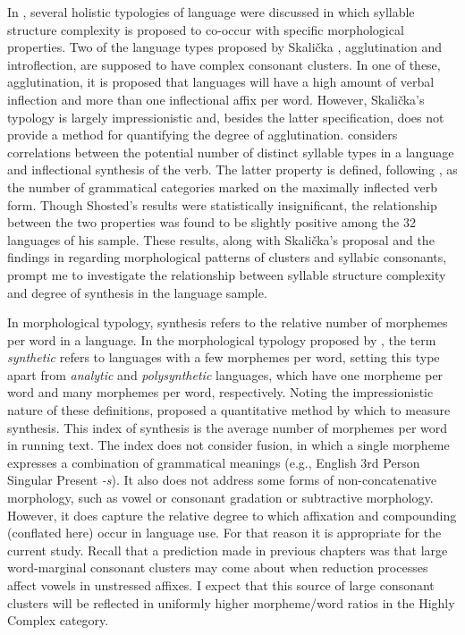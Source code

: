   In , several holistic typologies of language were discussed in which syllable structure complexity is proposed to co-occur with specific morphological properties. Two of the language types proposed by Skalička , agglutination and introflection, are supposed to have complex consonant clusters. In one of these, agglutination, it is proposed that languages will have a high amount of verbal inflection and more than one inflectional affix per word. However, Skalička’s typology is largely impressionistic and, besides the latter specification, does not provide a method for quantifying the degree of agglutination. \citet{Shosted2006} considers correlations between the potential number of distinct syllable types in a language and inflectional synthesis of the verb. The latter property is defined, following \citet{BickelNichols2005}, as the number of grammatical categories marked on the maximally inflected verb form. Though Shosted’s results were statistically insignificant, the relationship between the two properties was found to be slightly positive among the 32 languages of his sample. These results, along with Skalička’s proposal and the findings in  regarding morphological patterns of clusters and syllabic consonants, prompt me to investigate the relationship between syllable structure complexity and degree of synthesis in the language sample.

  In morphological typology, synthesis refers to the relative number of morphemes per word in a language. In the morphological typology proposed by \citet{Sapir1921}, the term \textit{synthetic} refers to languages with a few morphemes per word, setting this type apart from \textit{analytic} and \textit{polysynthetic} languages, which have one morpheme per word and many morphemes per word, respectively. Noting the impressionistic nature of these definitions, \citet{Greenberg1954} proposed a quantitative method by which to measure synthesis. This index of synthesis is the average number of morphemes per word in running text. The index does not consider fusion, in which a single morpheme expresses a combination of grammatical meanings (e.g., English 3rd Person Singular Present \textit{{}-s}). It also does not address some forms of non-concatenative morphology, such as vowel or consonant gradation or subtractive morphology. However, it does capture the relative degree to which affixation and compounding (conflated here) occur in language use. For that reason it is appropriate for the current study. Recall that a prediction made in previous chapters was that large word-marginal consonant clusters may come about when reduction processes affect vowels in unstressed affixes. I expect that this source of large consonant clusters will be reflected in uniformly higher morpheme/word ratios in the Highly Complex category.

